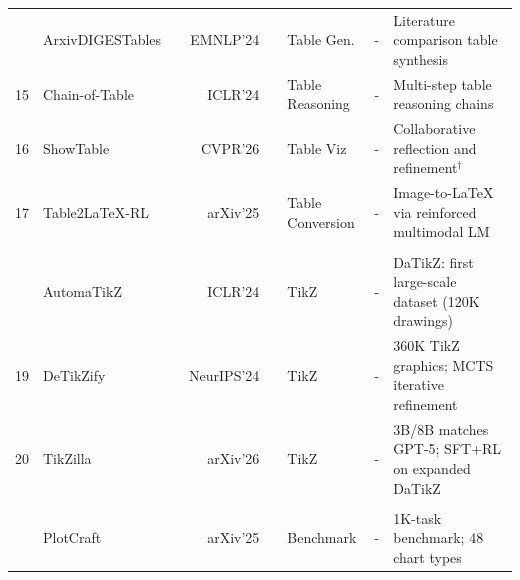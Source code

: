 \documentclass{llmxive}
\begin{document}
\begin{table}[!ht]
{\begin{tabular}{c|>{\centering\arraybackslash}p{3cm} r r |c| >{\centering\arraybackslash}p{2.7cm} |c| p{6.9cm}}
\addlinespace[1pt]
{14} & ArxivDIGESTables & \cite{arxivdigestables2024} & {\small EMNLP'24} & \href{https://arxiv.org/abs/2410.22360}{} & Table Gen.        & -                                                                                     & Literature comparison table synthesis \\
{15} & Chain-of-Table & \cite{chainoftable2024} & {\small ICLR'24} & \href{https://arxiv.org/abs/2401.04398}{} & Table Reasoning  & -                                                                                     & Multi-step table reasoning chains \\
{16} & ShowTable & \cite{showtable2025} & {\small CVPR'26} & \href{https://arxiv.org/abs/2512.13303}{} & Table Viz        & -                                                                                     & Collaborative reflection and refinement$^\dagger$ \\
{17} & Table2LaTeX-RL & \cite{table2latexrl2025} & {\small arXiv'25} & \href{https://arxiv.org/abs/2509.17589}{} & Table Conversion & -                                                                                     & Image-to-LaTeX via reinforced multimodal LM \\
\addlinespace[3pt]
\multicolumn{8}{@{}l}{\cellcolor{S4color!65}\textbf{\textsf{~~Mathematical Formulas \& TikZ}}} \\
\addlinespace[1pt]
{18} & AutomaTikZ & \cite{belouadi2024automatikz} & {\small ICLR'24} & \href{https://arxiv.org/abs/2310.00367}{} & TikZ             & -                                                                                     & DaTikZ: first large-scale dataset (120K drawings) \\
{19} & DeTikZify & \cite{belouadi2024detikzify} & {\small NeurIPS'24} & \href{https://arxiv.org/abs/2405.15306}{} & TikZ            & -                                                                                     & 360K TikZ graphics; MCTS iterative refinement \\
{20} & TikZilla & \cite{tikzilla2026} & {\small arXiv'26} & \href{https://arxiv.org/abs/2603.03072}{} & TikZ             & -                                                                                     & 3B/8B matches GPT-5; SFT+RL on expanded DaTikZ \\
\addlinespace[3pt]
\multicolumn{8}{@{}l}{\cellcolor{S4color!65}\textbf{\textsf{~~Visual Fidelity and Scientific Accuracy Assessment}}} \\
\addlinespace[1pt]
{21} & PlotCraft & \cite{plotcraft2025} & {\small arXiv'25} & \href{https://arxiv.org/abs/2511.00010}{} & Benchmark         & -                                                                                     & 1K-task benchmark; 48 chart types \\

\end{tabular}}
\end{table}
\end{document}

